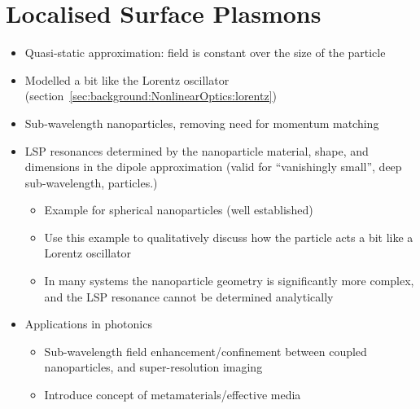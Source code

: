 \section{Localised Surface Plasmons}\label{sec:background:Plasmonics:Metamaterials}
\begin{itemize}
    \item Quasi-static approximation: field is constant over the size of the particle
    \item Modelled a bit like the Lorentz oscillator (section~\ref{sec:background:NonlinearOptics:lorentz})
    \item Sub-wavelength nanoparticles, removing need for momentum matching
    \item LSP resonances determined by the nanoparticle material, shape, and dimensions in the dipole approximation (valid for ``vanishingly small'', deep sub-wavelength, particles.)
    \begin{itemize}
        \item Example for spherical nanoparticles (well established)
        \item Use this example to qualitatively discuss how the particle acts a bit like a Lorentz oscillator
        \item In many systems the nanoparticle geometry is significantly more complex, and the LSP resonance cannot be determined analytically
    \end{itemize}
    \item Applications in photonics
    \begin{itemize}
        \item Sub-wavelength field enhancement/confinement between coupled nanoparticles, and super-resolution imaging
        \item Introduce concept of metamaterials/effective media
    \end{itemize}
\end{itemize}

